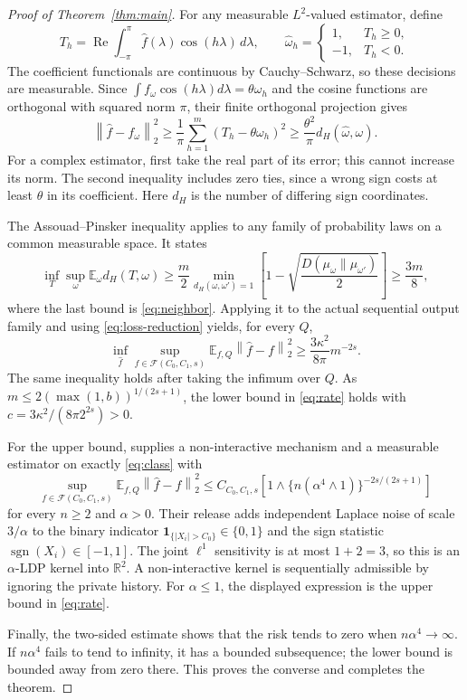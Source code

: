 \documentclass[11pt]{article}
\theoremstyle{remark}
\newcommand{\R}{\mathbb R}
\newcommand{\E}{\mathbb E}
\newcommand{\KL}{D}
\newcommand{\F}{\mathcal F}
\newcommand{\norm}[1]{\left\lVert#1\right\rVert}
\begin{document}
\begin{proof}[Proof of Theorem~\ref{thm:main}]
For any measurable $L^2$-valued estimator, define
\[
 T_h=\operatorname{Re}\int_{-\pi}^{\pi}\widehat f(\lambda)
                     \cos(h\lambda)\,d\lambda,
 \qquad
 \widehat\omega_h=\begin{cases}1,&T_h\ge0,\\-1,&T_h<0.\end{cases}
\]
The coefficient functionals are continuous by Cauchy--Schwarz, so these
decisions are measurable. Since $\int f_\omega\cos(h\lambda)d\lambda
=\theta\omega_h$ and the cosine functions are orthogonal with squared
norm $\pi$, their finite orthogonal projection gives
\begin{equation}\label{eq:loss-reduction}
 \norm{\widehat f-f_\omega}_2^2
 \ge\frac1\pi\sum_{h=1}^m(T_h-\theta\omega_h)^2
 \ge\frac{\theta^2}{\pi}d_H(\widehat\omega,\omega).
\end{equation}
For a complex estimator, first take the real part of its error; this cannot
increase its norm. The second inequality includes zero ties, since a wrong
sign costs at least $\theta$ in its coefficient. Here $d_H$ is the number
of differing sign coordinates.

The Assouad--Pinsker inequality \cite[Lemma 7]{IR} applies to any family
of probability laws on a common measurable space. It states
\[
 \inf_T\sup_\omega\E_\omega d_H(T,\omega)
 \ge\frac m2\min_{d_H(\omega,\omega')=1}
       \left[1-\sqrt{\frac{\KL(\mu_\omega\|\mu_{\omega'})}{2}}\right]
 \ge\frac{3m}{8},
\]
where the last bound is \eqref{eq:neighbor}. Applying it to the actual
sequential output family and using \eqref{eq:loss-reduction} yields, for
every $Q$,
\[
 \inf_{\widehat f}\sup_{f\in\F(C_0,C_1,s)}
        \E_{f,Q}\norm{\widehat f-f}_2^2
 \ge\frac{3\kappa^2}{8\pi}m^{-2s}.
\]
The same inequality holds after taking the infimum over $Q$. As
$m\le2(\max(1,b))^{1/(2s+1)}$, the lower bound in \eqref{eq:rate} holds
with $c=3\kappa^2/(8\pi 2^{2s})>0$.

For the upper bound, \cite[Theorem 3]{IR} supplies a non-interactive
mechanism and a measurable estimator on exactly \eqref{eq:class} with
\[
 \sup_{f\in\F(C_0,C_1,s)}\E_{f,Q}\norm{\widehat f-f}_2^2
 \le C_{C_0,C_1,s}
       \left[1\wedge\{n(\alpha^4\wedge1)\}^{-2s/(2s+1)}\right]
\]
for every $n\ge2$ and $\alpha>0$. Their release adds independent Laplace
noise of scale $3/\alpha$ to the binary indicator
$\mathbf 1_{\{|X_i|>C_0\}}\in\{0,1\}$ and the sign statistic
$\operatorname{sgn}(X_i)\in[-1,1]$. The joint $\ell^1$ sensitivity is
at most $1+2=3$, so this is an $\alpha$-LDP
kernel into $\R^2$. A non-interactive kernel is sequentially admissible by
ignoring the private history. For $\alpha\le1$, the displayed expression
is the upper bound in \eqref{eq:rate}.

Finally, the two-sided estimate shows that the risk tends to zero when
$n\alpha^4\to\infty$. If $n\alpha^4$ fails to tend to infinity, it has a
bounded subsequence; the lower bound is bounded away from zero there.
This proves the converse and completes the theorem.
\end{proof}
\end{document}
